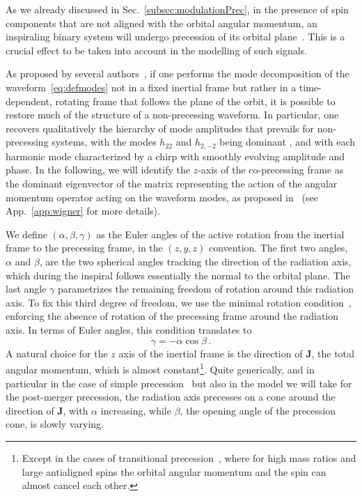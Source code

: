 \documentclass[aps,showpacs,twocolumn,
prd,superscriptaddress,nofootinbib]{revtex4-1}
\newcommand{\be}{\begin{equation}}
\newcommand{\ee}{\end{equation}}
\newcommand{\jgb}[1]{{\color{DarkGreen} #1}}
\begin{document}
As we already discussed in Sec.~\ref{subsec:modulationPrec}, in the presence of spin components that are not aligned with the orbital angular momentum, an inspiraling binary system will undergo precession of its orbital plane~\cite{Apostolatos+94, Kidder95}. This is a crucial effect to be taken into account in the modelling of such signals.

As proposed by several authors~\cite{BCV03b, BCPTV05, Schmidt+10, OShaughnessy+11, Boyle+11}, if one performs the mode decomposition of the waveform~\eqref{eq:defmodes} not in a fixed inertial frame but rather in a time-dependent, rotating frame that follows the plane of the orbit, it is possible to restore much of the structure of a non-precessing waveform. In particular, one recovers qualitatively the hierarchy of mode amplitudes that prevails for non-precessing systems, with the modes $h_{22}$ and $h_{2,-2}$ being dominant\jgb{, and with each harmonic mode characterized by a chirp with smoothly evolving amplitude and phase}. In the following, we will identify the $z$-axis of the co-precessing frame as the dominant eigenvector of the matrix representing the action of the angular momentum operator acting on the waveform modes, as proposed in~\cite{OShaughnessy+11} (see App.~\ref{app:wigner} for more details).

We define $(\alpha, \beta, \gamma)$ as the Euler angles of the active rotation from the inertial frame to the precessing frame, in the $(z,y,z)$ convention. The first two angles, $\alpha$ and $\beta$, are the two spherical angles tracking the direction of the radiation axis, which during the inspiral follows essentially the normal to the orbital plane. The last angle $\gamma$ parametrizes the remaining freedom of rotation around this radiation axis. To fix this third degree of freedom, we use the minimal rotation condition~\cite{Boyle+11}, enforcing the absence of rotation of the precessing frame around the radiation axis. In terms of Euler angles, this condition translates to
\be\label{eq:gammadot}
	\dot{\gamma} = -\dot{\alpha}\cos \beta \,.
\ee
A natural choice for the $z$ axis of the inertial frame is the direction of $\bm{J}$, the total angular momentum, which is almost constant\footnote{Except in the cases of transitional precession~\cite{Apostolatos+94}, where for high mass ratios and large antialigned spins the orbital angular momentum and the spin can almost cancel each other.}. Quite generically, and in particular in the case of simple precession~\cite{Apostolatos+94, Kidder95} but also in the model we will take for the post-merger precession, the radiation axis precesses on a cone around the direction of $\bm{J}$, with $\alpha$ increasing, while $\beta$, the opening angle of the precession cone, is slowly varying.
\end{document}

